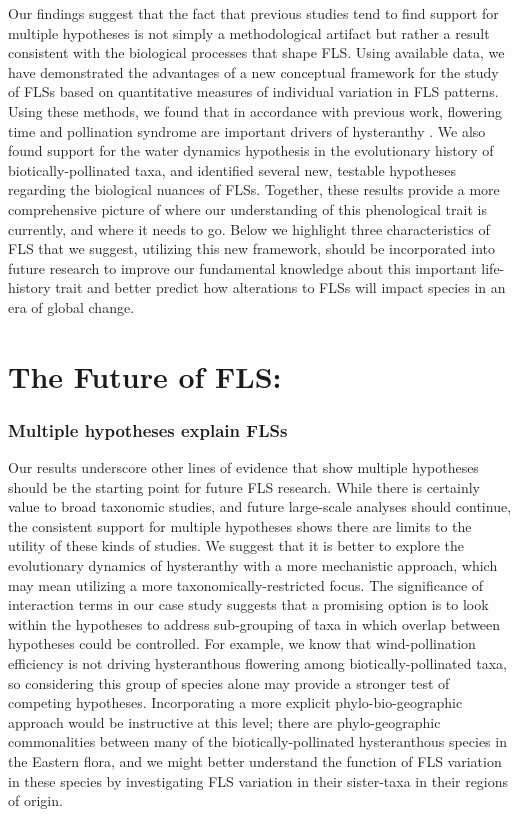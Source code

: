 \documentclass{article}
\begin{document}
\noindent Our findings suggest that the fact that previous studies tend to find support for multiple hypotheses \citep{Bolmgren2003,Gougherty2018,Savage2019} is not simply a methodological artifact but rather a result consistent with the biological processes that shape FLS. Using available data, we have demonstrated the advantages of a new conceptual framework for the study of FLSs based on quantitative measures of individual variation in FLS patterns. Using these methods, we found that in accordance with previous work, flowering time and pollination syndrome are important drivers of hysteranthy \citep{Gougherty2018}. We also found support for the water dynamics hypothesis in the evolutionary history of biotically-pollinated taxa, and identified several new, testable hypotheses regarding the biological nuances of FLSs. Together, these results provide a more comprehensive picture of where our understanding of this phenological trait is currently, and where it needs to go. Below we highlight three characteristics of FLS that we suggest, utilizing this new framework, should be incorporated into future research to improve our fundamental knowledge about this important life-history trait and better predict how alterations to FLSs will impact species in an era of global change.
\section*{The Future of FLS:}
\subsubsection*{Multiple hypotheses explain FLSs}

\noindent Our results underscore other lines of evidence that show multiple hypotheses should be the starting point for future FLS research. While there is certainly value to broad taxonomic studies, and future large-scale analyses should continue, the consistent support for multiple hypotheses shows there are limits to the utility of these kinds of studies. We suggest that it is better to explore the evolutionary dynamics of hysteranthy with a more mechanistic approach, which may mean utilizing a more taxonomically-restricted focus. The significance of interaction terms in our case study suggests that a promising option is to look within the hypotheses to address sub-grouping of taxa in which overlap between hypotheses could be controlled. For example, we know that wind-pollination efficiency is not driving hysteranthous flowering among biotically-pollinated taxa, so considering this group of species alone may provide a stronger test of competing hypotheses. Incorporating a more explicit phylo-bio-geographic approach would be instructive at this level; there are phylo-geographic commonalities between many of the biotically-pollinated hysteranthous species in the Eastern flora, and we might better understand the function of FLS variation in these species by investigating FLS variation in their sister-taxa in their regions of origin.\\ 
\end{document}
